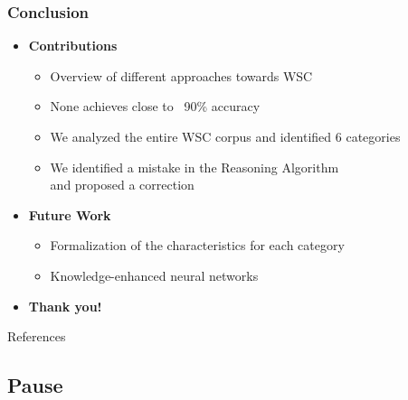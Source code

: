 \documentclass[c,8pt,xcolor...,x11names]{beamer}
\begin{document}
\subsubsection{Conclusion}

\begin{frame}[fragile] 
\begin{itemize}
	\item {\bf \large \textcolor{OrangeRed1}{Contributions}}\\
	  \begin{itemize}
		\normalsize
		\item Overview of different approaches towards WSC
		\item None achieves close to ~90\% accuracy 
		\item We \alert{analyzed} the entire WSC corpus and identified 6 categories
		\item We identified a mistake in the Reasoning Algorithm \\and proposed a correction    
	\end{itemize}
 
    \item {\bf \large \textcolor{OrangeRed1}{Future Work}}\\
    \begin{itemize}
    	\normalsize
    	\item Formalization of the characteristics for each category
    	\item Knowledge-enhanced neural networks \linebreak
    \end{itemize}	

\item {\bf \large \textcolor{OrangeRed1}{Thank you!}}
\end{itemize}

\end{frame}


\begin{frame}{References}
	
	
	\tiny{
		
	}
\end{frame}

\subsection{Pause}
\end{document}
